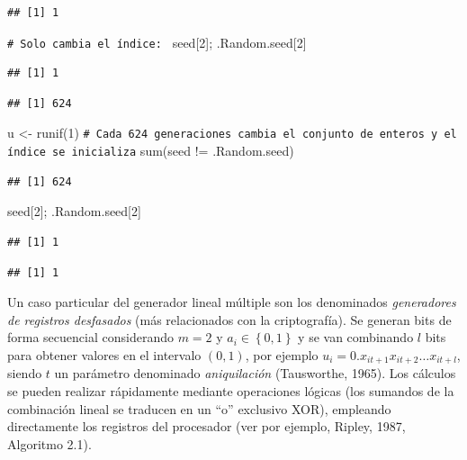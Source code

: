 \documentclass[
]{book}
\newenvironment{Shaded}{\begin{snugshade}}{\end{snugshade}}
\newcommand{\CommentTok}[1]{\textcolor[rgb]{0.56,0.35,0.01}{\textit{#1}}}
\newcommand{\DecValTok}[1]{\textcolor[rgb]{0.00,0.00,0.81}{#1}}
\newcommand{\FunctionTok}[1]{\textcolor[rgb]{0.00,0.00,0.00}{#1}}
\newcommand{\NormalTok}[1]{#1}
\newcommand{\OtherTok}[1]{\textcolor[rgb]{0.56,0.35,0.01}{#1}}
\newcommand{\SpecialCharTok}[1]{\textcolor[rgb]{0.00,0.00,0.00}{#1}}
\theoremstyle{break}
\theoremstyle{nonumberplain}
\renewcommand{\CommentTok}[1]{\textcolor[rgb]{0.41,0.41,0.41}{\texttt{#1}}}
\begin{document}
\begin{verbatim}
## [1] 1
\end{verbatim}

\begin{Shaded}
\begin{Highlighting}[]
\CommentTok{\# Solo cambia el índice: }
\NormalTok{seed[}\DecValTok{2}\NormalTok{]; .Random.seed[}\DecValTok{2}\NormalTok{]}
\end{Highlighting}
\end{Shaded}

\begin{verbatim}
## [1] 1
\end{verbatim}

\begin{verbatim}
## [1] 624
\end{verbatim}

\begin{Shaded}
\begin{Highlighting}[]
\NormalTok{u }\OtherTok{\textless{}{-}} \FunctionTok{runif}\NormalTok{(}\DecValTok{1}\NormalTok{)}
\CommentTok{\# Cada 624 generaciones cambia el conjunto de enteros y el índice se inicializa}
\FunctionTok{sum}\NormalTok{(seed }\SpecialCharTok{!=}\NormalTok{ .Random.seed)}
\end{Highlighting}
\end{Shaded}

\begin{verbatim}
## [1] 624
\end{verbatim}

\begin{Shaded}
\begin{Highlighting}[]
\NormalTok{seed[}\DecValTok{2}\NormalTok{]; .Random.seed[}\DecValTok{2}\NormalTok{]}
\end{Highlighting}
\end{Shaded}

\begin{verbatim}
## [1] 1
\end{verbatim}

\begin{verbatim}
## [1] 1
\end{verbatim}

Un caso particular del generador lineal múltiple son los denominados \emph{generadores de registros desfasados} (más relacionados con la criptografía).
Se generan bits de forma secuencial considerando \(m=2\) y \(a_{i} \in \left \{ 0,1\right \}\) y se van combinando \(l\) bits para obtener valores en el intervalo \((0, 1)\), por ejemplo \(u_i = 0 . x_{it+1} x_{it+2} \ldots x_{it+l}\), siendo \(t\) un parámetro denominado \emph{aniquilación} (Tausworthe, 1965).
Los cálculos se pueden realizar rápidamente mediante operaciones lógicas (los sumandos de la combinación lineal se traducen en un ``o'' exclusivo XOR), empleando directamente los registros del procesador (ver por ejemplo, Ripley, 1987, Algoritmo 2.1).
\end{document}
